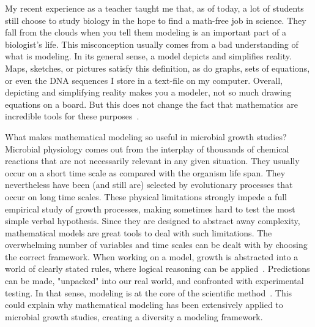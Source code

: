 My recent experience as a teacher taught me that, as of today, a lot of students still choose to study biology in the hope to find a math-free job in science.
They fall from the clouds when you tell them modeling is an important part of a biologist's life.
This misconception usually comes from a bad understanding of what is modeling.
In its general sense, a model depicts and simplifies reality.
Maps, sketches, or pictures satisfy this definition, as do graphs, sets of equations, or even the DNA sequences I store in a text-file on my computer.
Overall, depicting and simplifying reality makes you a modeler, not so much drawing equations on a board.
But this does not change the fact that mathematics are incredible tools for these purposes~\cite{servedio_not_2014,mcgill_calm_2013}.

What makes mathematical modeling so useful in microbial growth studies?
Microbial physiology comes out from the interplay of thousands of chemical reactions that are not necessarily relevant in any given situation.
They usually occur on a short time scale as compared with the organism life span.
They nevertheless have been (and still are) selected by evolutionary processes that occur on long time scales.
These physical limitations strongly impede a full empirical study of growth processes, making sometimes hard to test the most simple verbal hypothesis.
Since they are designed to abstract away complexity, mathematical models are great tools to deal with such limitations.
The overwhelming number of variables and time scales can be dealt with by choosing the correct framework.
When working on a model, growth is abstracted into a world of clearly stated rules, where logical reasoning can be applied~\cite{servedio_not_2014}.
Predictions can be made, "unpacked" into our real world, and confronted with experimental testing.
In that sense, modeling is at the core of the scientific method~\cite{mcgill_calm_2013}.
This could explain why mathematical modeling has been extensively applied to microbial growth studies, creating a diversity a modeling framework.

